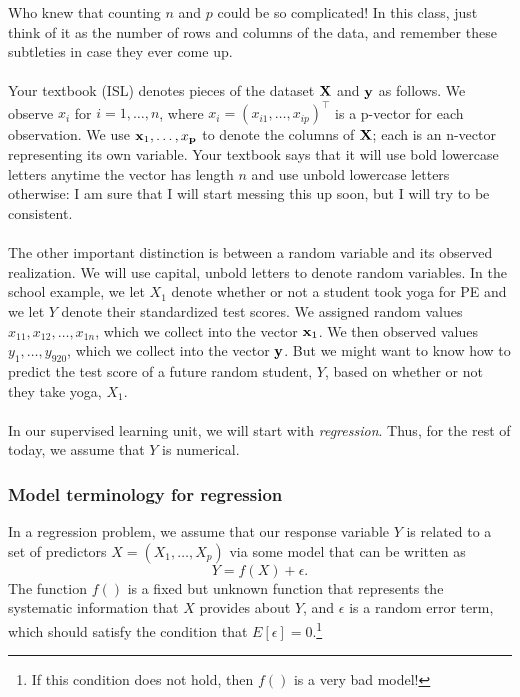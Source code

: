 \documentclass[titlepage,10pt]{scrartcl}
\begin{document}
Who knew that counting $n$ and $p$ could be so complicated! In this class, just think of it as the number of rows and columns of the data, and remember these subtleties in case they ever come up. \\
\\
Your textbook (ISL) denotes pieces of the dataset $\bold{X}$ and $\bold{y}$ as follows. We observe $x_i$ for $i = 1,\ldots,n$, where $x_i = (x_{i1}, \ldots, x_{ip})^\top$ is a p-vector for each observation. We use $\bold{x}_1,\ldots,x_\bold{p}$ to denote the columns of $\bold{X}$; each is an n-vector representing its own variable. Your textbook says that it will use bold lowercase letters anytime the vector has length $n$ and use unbold lowercase letters otherwise: I am sure that I will start messing this up soon, but I will try to be consistent. \\
\\
The other important distinction is between a random variable and its observed realization. We will use capital, unbold letters to denote random variables. In the school example, we let $X_1$ denote whether or not a student took yoga for PE and we let $Y$ denote their standardized test scores. We assigned random values $x_{11}, x_{12},\ldots, x_{1n}$, which we collect into the vector $\bold{x}_1$. We then observed values $y_1,\ldots,y_{920}$, which we collect into the vector $\bold{y}$. But we might want to know how to predict the test score of a future random student, $Y$, based on whether or not they take yoga, $X_1$. \\
\\
In our supervised learning unit, we will start with \emph{regression}. Thus, for the rest of today, we assume that $Y$ is numerical. 

\subsubsection{Model terminology for regression}

In a regression problem, we assume that our response variable $Y$ is related to a set of predictors $X= (X_1,\ldots,X_p)$ via some model that can be written as
\begin{equation}
Y = f(X)+\epsilon. 
\end{equation}
The function $f()$ is a fixed but unknown function that represents the systematic information that $X$ provides about $Y$, and $\epsilon$ is a random error term, which should satisfy the condition that $E[\epsilon] = 0$.\footnote{If this condition does not hold, then $f()$ is a very bad model!}
\end{document}

